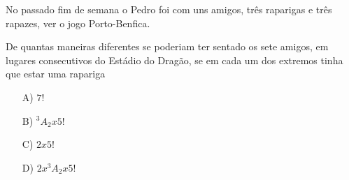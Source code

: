 No passado fim de semana o Pedro foi com uns amigos, três raparigas e três rapazes, ver o jogo Porto-Benfica. 

De quantas maneiras diferentes se poderiam ter sentado os sete amigos, em lugares consecutivos do Estádio do Dragão, se em cada um dos extremos tinha que estar uma rapariga
\begin{enumerate}
\item [A)] $7!$
\item [B)] $^3A_2x5!$
\item [C)] $2x5!$
\item [D)] $2x^3A_2x5!$
\end{enumerate}

